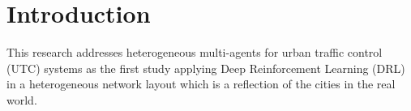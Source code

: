 \documentclass{llncs}
\begin{document}
\begin{abstract}
\end{abstract}

\section{Introduction}

This research addresses heterogeneous multi-agents for  urban traffic control (UTC) systems as the first study applying Deep Reinforcement Learning (DRL) in a heterogeneous network layout which is a reflection of the cities in the real world. 
\end{document}
